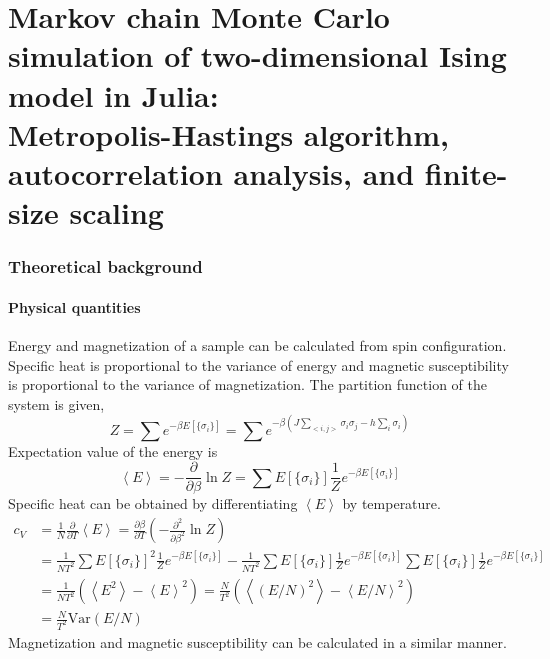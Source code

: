 \documentclass[fleqn]{article}
\begin{document}
\part*{Markov chain Monte Carlo simulation of two-dimensional Ising model in Julia: \\ \Large Metropolis-Hastings algorithm, autocorrelation analysis, and finite-size scaling}

\section{Theoretical background}

\subsection{Physical quantities}
Energy and magnetization of a sample can be calculated from spin configuration. Specific heat is proportional to the variance of energy and magnetic susceptibility is proportional to the variance of magnetization. The partition function of the system is given,
\begin{equation}
	Z = \sum e^{-\beta E[\{\sigma_i\}]} = \sum e^{-\beta (J \sum_{<i,j>} \sigma_i \sigma_j - h \sum_{i} \sigma_i)}
\end{equation}
Expectation value of the energy is
\begin{equation}
\left<E \right> = -\frac{\partial}{\partial\beta} \ln Z = \sum E[\{\sigma_i\}] \frac{1}{Z} e^{-\beta E[\{\sigma_i\}]}
\end{equation}
Specific heat can be obtained by differentiating $\left<E \right>$ by temperature.
\begin{align}
c_V &= \frac{1}{N} \frac{\partial}{\partial T} \left<E \right> = \frac{\partial \beta}{\partial T} \left( - \frac{\partial^2}{\partial\beta^2} \ln Z \right) \nonumber\\
    &= \frac{1}{N T^2} \sum E[\{\sigma_i\}]^2 \frac{1}{Z} e^{-\beta E[\{\sigma_i\}]} - \frac{1}{N T^2} \sum E[\{\sigma_i\}] \frac{1}{Z} e^{-\beta E[\{\sigma_i\}]} \sum E[\{\sigma_i\}] \frac{1}{Z} e^{-\beta E[\{\sigma_i\}]} \nonumber\\
    &= \frac{1}{N T^2} \left( \left<E^2 \right> - \left<E \right>^2 \right) = \frac{N}{T^2} \left( \left<\left(E/N \right)^2 \right> - \left<E/N \right>^2 \right) \nonumber\\
    &= \frac{N}{T^2} \text{Var}(E/N)
\end{align}
Magnetization and magnetic susceptibility can be calculated in a similar manner.
\end{document}
